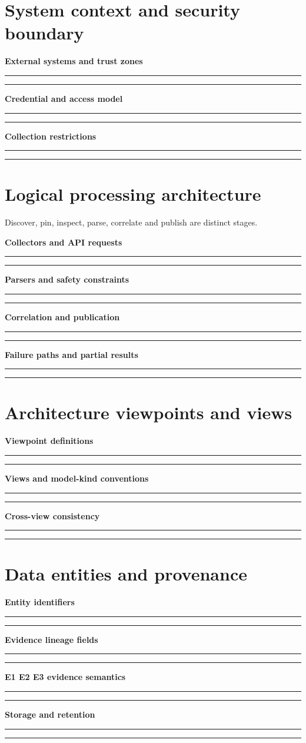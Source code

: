 \documentclass[11pt,letterpaper]{article}
\newcommand{\Field}[2]{\par\noindent\textbf{#1}\par\vspace{1em}\noindent\rule{0.96\linewidth}{0.4pt}\par\vspace{1.0em}\noindent\rule{0.96\linewidth}{0.4pt}\par\vspace{1em}}
\begin{document}
\section{System context and security boundary}
\Field{External systems and trust zones}{Describe GitHub APIs, installations, optional registries, service catalog and deployment evidence sources.}
\Field{Credential and access model}{Record least-privilege GitHub App authorization, token scope and permissions.}
\Field{Collection restrictions}{Document prohibition on untrusted action/script execution, write actions and secrets collection.}

\section{Logical processing architecture}
Discover, pin, inspect, parse, correlate and publish are distinct stages.

\Field{Collectors and API requests}{Define paginated inventory, immutable SHA pinning, backoff, and checkpointing.}
\Field{Parsers and safety constraints}{Specify GitHub Actions YAML, manifest parsing, workspace resolution, and nonexecution policy.}
\Field{Correlation and publication}{Describe typed edge creation, evidence classes, uncertainty handling and output interfaces.}
\Field{Failure paths and partial results}{Record denied, missing, truncated, malformed, stale and rate-limited states.}

\section{Architecture viewpoints and views}
\Field{Viewpoint definitions}{Describe repository topology, workflow graph, component, artifact, and deployment evidence views.}
\Field{Views and model-kind conventions}{Identify diagrams, schema versions, legends, viewpoints and correspondence rules.}
\Field{Cross-view consistency}{Describe repository-to-component, job-to-artifact and artifact-to-environment reconciliation.}

\section{Data entities and provenance}
\Field{Entity identifiers}{Define Organization, Repository, Revision, Workflow, Job, Action, Component, Artifact, Environment, Deployment.}
\Field{Evidence lineage fields}{Capture source URI/path, pinned SHA, parser and rule version, collection time, status and quality.}
\Field{E1 E2 E3 evidence semantics}{Keep observed configuration, inferred relationship, and externally verified evidence distinct.}
\Field{Storage and retention}{Record snapshot versioning, partitioning, tenancy, retention, encryption and access.}
\end{document}
